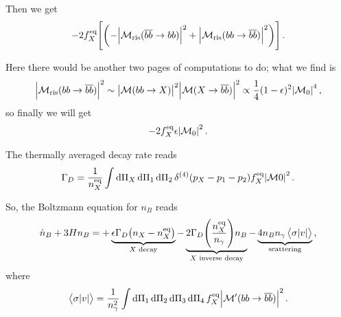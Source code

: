 \documentclass[main.tex]{subfiles}
\begin{document}
Then we get 
%
\begin{align}
-2 f_X^{\text{eq}} \qty[\qty(- \abs{\mathcal{M}_{\text{ris}}(\overline{b} \overline{b} \to bb)}^2 + \abs{\mathcal{M}_{\text{ris}} (bb \to \overline{b} \overline{b})}^2)]
\,.
\end{align}

Here there would be another two pages of computations to do; what we find is 
%
\begin{align}
\abs{\mathcal{M}_{\text{ris}}(bb \to \overline{b}\overline{b})}^2
\sim 
\abs{\mathcal{M}(bb \to X)}^2
\abs{\mathcal{M}(X \to \overline{b}\overline{b})}^2
\propto \frac{1}{4} (1 - \epsilon )^2 \abs{\mathcal{M}_0}^4
\,,
\end{align}
%
so finally we will get 
%
\begin{align}
-2 f_X^{\text{eq}} \epsilon \abs{\mathcal{M}_0}^2
\,.
\end{align}

The thermally averaged decay rate reads 
%
\begin{align}
\Gamma _D = \frac{1}{n_X^{\text{eq}}} \int \dd{\Pi _X} \dd{\Pi_1 } \dd{\Pi _2} \delta^{(4)} (p_X - p_1 - p_2 ) f_X^{\text{eq}} \abs{\mathcal{M}0 }^2
\,.
\end{align}

So, the Boltzmann equation for \(n_B\) reads
%
\begin{align}
\dot{n}_B + 3 H n_B = + \underbrace{\epsilon \Gamma _D \qty(n_X - n_X^{\text{eq}})}_{X \text{ decay}}
- \underbrace{2 \Gamma _D \qty( \frac{n_X^{\text{eq}}}{n_\gamma }) n_B }_{X \text{ inverse decay}}
- \underbrace{4 n_B n_\gamma \expval{\sigma \abs{v}}}_{\text{scattering}}
\,,
\end{align}
%
where 
%
\begin{align}
\expval{\sigma \abs{v}} = \frac{1}{n_\gamma^2}
\int \dd{\Pi_1 } \dd{\Pi_2 } \dd{\Pi_3 } \dd{\Pi_4 }
f_X^{\text{eq}} \abs{\mathcal{M}' (bb \to \overline{b}\overline{b})}^2
\,.
\end{align}
\end{document}
